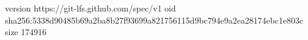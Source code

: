 version https://git-lfs.github.com/spec/v1
oid sha256:5338d90485b69a2ba8b27f93699a821756115d9bc794e9a2ea28174ebc1e803c
size 174916

